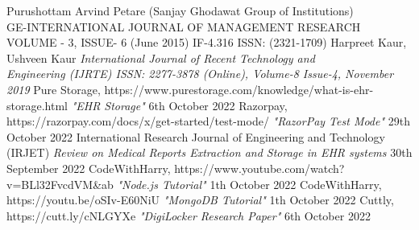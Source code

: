 \documentclass[a4paper, 12pt]{report}
\begin{document}
\newpage

\begin{thebibliography}{15}
Purushottam Arvind Petare (Sanjay Ghodawat Group of Institutions)
\\{GE-INTERNATIONAL JOURNAL OF MANAGEMENT   RESEARCH \\ VOLUME - 3, ISSUE- 6 (June 2015) IF-4.316 ISSN: (2321-1709)}
Harpreet Kaur, Ushveen Kaur
\textit{International Journal of Recent Technology and \\Engineering (IJRTE)
ISSN: 2277-3878 (Online), Volume-8 Issue-4, November 2019}
Pure Storage, https://www.purestorage.com/knowledge/what-is-ehr-storage.html
\textit{"EHR Storage"} 6th October 2022
Razorpay, https://razorpay.com/docs/x/get-started/test-mode/
\textit{"RazorPay Test Mode"} 29th October 2022
International Research Journal of Engineering and Technology (IRJET)
\textit{Review on Medical Reports Extraction and Storage in EHR systems } 30th September 2022
CodeWithHarry, https://www.youtube.com/watch?v=BLl32FvcdVM&ab
\textit{"Node.js Tutorial"} 1th October 2022
CodeWithHarry, https://youtu.be/oSIv-E60NiU
\textit{"MongoDB Tutorial"} 1th October 2022
Cuttly, https://cutt.ly/cNLGYXe
\textit{"DigiLocker Research Paper"} 6th October 2022
\end{thebibliography}
\end{document}
